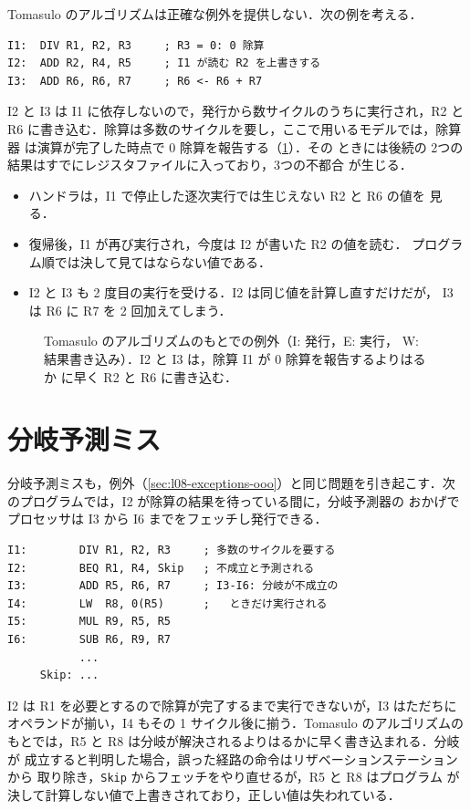 \documentclass[../main.tex]{subfiles}
\begin{document}
Tomasulo のアルゴリズムは正確な例外を提供しない．次の例を考える．
\begin{lstlisting}[language={[x86masm]Assembler}, numbers=none]
I1:  DIV R1, R2, R3     ; R3 = 0: 0 除算
I2:  ADD R2, R4, R5     ; I1 が読む R2 を上書きする
I3:  ADD R6, R6, R7     ; R6 <- R6 + R7
\end{lstlisting}
I2 と I3 は I1 に依存しないので，発行から数サイクルのうちに実行され，R2 と
R6 に書き込む．除算は多数のサイクルを要し，ここで用いるモデルでは，除算器
は演算が完了した時点で 0 除算を報告する（\cref{fig:l08-exception}）．その
ときには後続の 2つの結果はすでにレジスタファイルに入っており，3つの不都合
が生じる．
\begin{itemize}
  \item ハンドラは，I1 で停止した逐次実行では生じえない R2 と R6 の値を
    見る．
  \item 復帰後，I1 が再び実行され，今度は I2 が書いた R2 の値を読む．
    プログラム順では決して見てはならない値である．
  \item I2 と I3 も 2 度目の実行を受ける．I2 は同じ値を計算し直すだけだが，
    I3 は R6 に R7 を 2 回加えてしまう．
\end{itemize}

\begin{figure}[htbp]
  \centering
  
  \caption{Tomasulo のアルゴリズムのもとでの例外（I: 発行，E: 実行，
    W: 結果書き込み）．I2 と I3 は，除算 I1 が 0 除算を報告するよりはるか
    に早く R2 と R6 に書き込む．}
  \label{fig:l08-exception}
\end{figure}

\section{分岐予測ミス}
\label{sec:l08-mispredictions}

分岐予測ミスも，例外（\cref{sec:l08-exceptions-ooo}）と同じ問題を引き起こす．次のプログラムでは，I2 が除算の結果を待っている間に，分岐予測器の
おかげでプロセッサは I3 から I6 までをフェッチし発行できる．
\begin{lstlisting}[language={[x86masm]Assembler}, numbers=none]
I1:        DIV R1, R2, R3     ; 多数のサイクルを要する
I2:        BEQ R1, R4, Skip   ; 不成立と予測される
I3:        ADD R5, R6, R7     ; I3-I6: 分岐が不成立の
I4:        LW  R8, 0(R5)      ;   ときだけ実行される
I5:        MUL R9, R5, R5
I6:        SUB R6, R9, R7
           ...
     Skip: ...
\end{lstlisting}
I2 は R1 を必要とするので除算が完了するまで実行できないが，I3 はただちに
オペランドが揃い，I4 もその 1 サイクル後に揃う．Tomasulo のアルゴリズムの
もとでは，R5 と R8 は分岐が解決されるよりはるかに早く書き込まれる．分岐が
成立すると判明した場合，誤った経路の命令はリザベーションステーションから
取り除き，\texttt{Skip} からフェッチをやり直せるが，R5 と R8 はプログラム
が決して計算しない値で上書きされており，正しい値は失われている．
\end{document}
